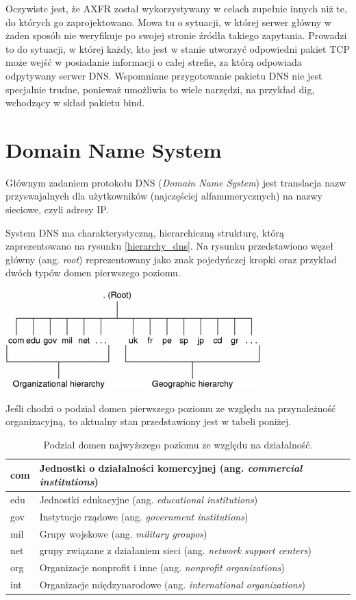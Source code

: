 Oczywiste jest, że AXFR został wykorzystywany w celach zupełnie innych niż te, do których go zaprojektowano. Mowa tu o sytuacji, w której serwer główny w żaden sposób nie weryfikuje po swojej stronie źródła takiego zapytania. Prowadzi to do sytuacji, w której każdy, kto jest w stanie utworzyć odpowiedni pakiet TCP może wejść w posiadanie informacji o całej strefie, za którą odpowiada odpytywany serwer DNS. Wspomniane przygotowanie pakietu DNS nie jest specjalnie trudne, ponieważ umożliwia to wiele narzędzi, na przykład dig, wchodzący w skład pakietu bind. 

\section{Domain Name System}
Głównym zadaniem protokołu DNS (\textit{Domain Name System}) jest translacja nazw przyswajalnych dla użytkowników (najczęściej alfanumerycznych) na nazwy sieciowe, czyli adresy IP. 

System DNS ma charakterystyczną, hierarchiczną strukturę, którą zaprezentowano na rysunku \ref{hierarchy_dns}. Na rysunku przedstawiono węzeł główny (ang. \textit{root}) reprezentowany jako znak pojedyńczej kropki oraz przykład dwóch typów domen pierwszego poziomu.

\includegraphics[scale=0.33]{image/hierarchy_dns}\label{hierarchy_dns}

Jeśli chodzi o podział domen pierwszego poziomu ze względu na przynależność organizacyjną, to aktualny stan przedstawiony jest w tabeli poniżej.

\begin{table}[]
	\centering
	\caption{Podział domen najwyższego poziomu ze względu na działalność.}
	\label{my-label}
	\begin{tabular}{lllll}
		\hline
		com & Jednostki o działalności komercyjnej (ang. \textit{commercial institutions}) \\
		\hline
		edu & Jednostki edukacyjne (ang. \textit{educational institutions})\\
		\hline
		gov & Instytucje rządowe (ang. \textit{government institutions}) \\
		\hline
		mil & Grupy wojskowe (ang. \textit{military groupos}) \\
		\hline
		net & grupy związane z działaniem sieci (ang. \textit{network support centers}) \\
		\hline
		org & Organizacje nonprofit i inne (ang. \textit{nonprofit organizations}) \\
		\hline
		int & Organizacje międzynarodowe (ang. \textit{international organizations}) \\
		\hline 
	\end{tabular}
\end{table}

